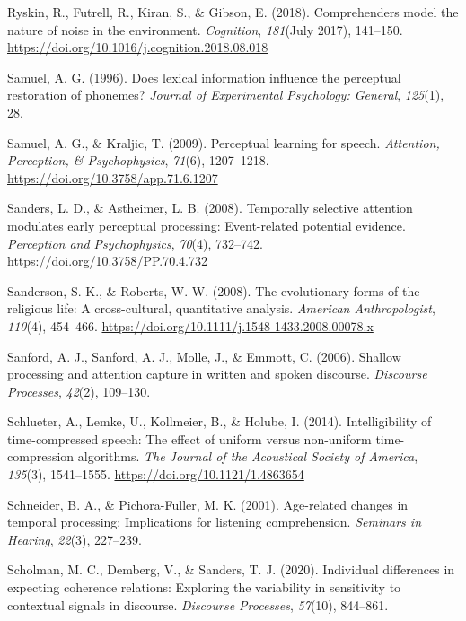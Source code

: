 \documentclass[a4paper, nobind]{templates/ociamthesis}
\newlength{\cslhangindent}
\newenvironment{CSLReferences}[2] %
 {%
  \setlength{\parindent}{0pt}
  \ifodd #1
  \let\oldpar\par
  \def\par{\hangindent=\cslhangindent\oldpar}
  \fi
  \setlength{\parskip}{1mm}
  \setlength{\baselineskip}{6mm}
 }%
 {}
\begin{document}
\begin{CSLReferences}{1}{0}
\leavevmode{}%
Ryskin, R., Futrell, R., Kiran, S., \& Gibson, E. (2018). {Comprehenders model the nature of noise in the environment}. \emph{Cognition}, \emph{181}(July 2017), 141--150. \url{https://doi.org/10.1016/j.cognition.2018.08.018}

\leavevmode{}%
Samuel, A. G. (1996). Does lexical information influence the perceptual restoration of phonemes? \emph{Journal of Experimental Psychology: General}, \emph{125}(1), 28.

\leavevmode{}%
Samuel, A. G., \& Kraljic, T. (2009). Perceptual learning for speech. \emph{Attention, Perception, \& Psychophysics}, \emph{71}(6), 1207--1218. \url{https://doi.org/10.3758/app.71.6.1207}

\leavevmode{}%
Sanders, L. D., \& Astheimer, L. B. (2008). {Temporally selective attention modulates early perceptual processing: Event-related potential evidence}. \emph{Perception and Psychophysics}, \emph{70}(4), 732--742. \url{https://doi.org/10.3758/PP.70.4.732}

\leavevmode{}%
Sanderson, S. K., \& Roberts, W. W. (2008). {The evolutionary forms of the religious life: A cross-cultural, quantitative analysis}. \emph{American Anthropologist}, \emph{110}(4), 454--466. \url{https://doi.org/10.1111/j.1548-1433.2008.00078.x}

\leavevmode{}%
Sanford, A. J., Sanford, A. J., Molle, J., \& Emmott, C. (2006). Shallow processing and attention capture in written and spoken discourse. \emph{Discourse Processes}, \emph{42}(2), 109--130.

\leavevmode{}%
Schlueter, A., Lemke, U., Kollmeier, B., \& Holube, I. (2014). {Intelligibility of time-compressed speech: The effect of uniform versus non-uniform time-compression algorithms}. \emph{The Journal of the Acoustical Society of America}, \emph{135}(3), 1541--1555. \url{https://doi.org/10.1121/1.4863654}

\leavevmode{}%
Schneider, B. A., \& Pichora-Fuller, M. K. (2001). Age-related changes in temporal processing: Implications for listening comprehension. \emph{Seminars in Hearing}, \emph{22}(3), 227--239.

\leavevmode{}%
Scholman, M. C., Demberg, V., \& Sanders, T. J. (2020). Individual differences in expecting coherence relations: Exploring the variability in sensitivity to contextual signals in discourse. \emph{Discourse Processes}, \emph{57}(10), 844--861.


\end{CSLReferences}
\end{document}
